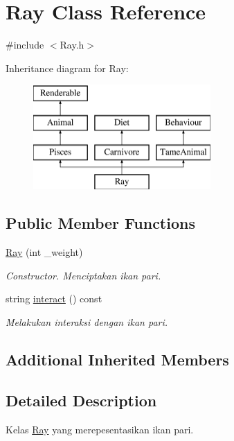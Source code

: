 \hypertarget{classRay}{\section{Ray Class Reference}
\label{classRay}
}


{\ttfamily \#include $<$Ray.\+h$>$}

Inheritance diagram for Ray\+:\begin{figure}[H]
\begin{center}
\leavevmode
\includegraphics[height=4.000000cm]{classRay}
\end{center}
\end{figure}
\subsection*{Public Member Functions}
\begin{DoxyCompactItemize}
\item 
\hypertarget{classRay_a3ad18fbb8b6f65fff3e9b40ca829d3a6}{\hyperlink{classRay_a3ad18fbb8b6f65fff3e9b40ca829d3a6}{Ray} (int \+\_\+weight)}\label{classRay_a3ad18fbb8b6f65fff3e9b40ca829d3a6}

\begin{DoxyCompactList}\small\item\em Constructor. Menciptakan ikan pari. \end{DoxyCompactList}\item 
string \hyperlink{classRay_a4f0ad22f7378e085613d3c2289d558aa}{interact} () const 
\begin{DoxyCompactList}\small\item\em Melakukan interaksi dengan ikan pari. \end{DoxyCompactList}\end{DoxyCompactItemize}
\subsection*{Additional Inherited Members}


\subsection{Detailed Description}
Kelas \hyperlink{classRay}{Ray} yang merepesentasikan ikan pari. 

